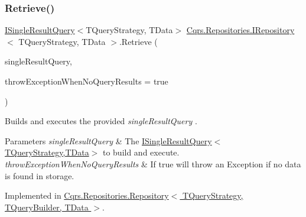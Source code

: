 \mbox{\label{interfaceCqrs_1_1Repositories_1_1IRepository_a65848508067b81e82da72af2063f2c07_a65848508067b81e82da72af2063f2c07}} 
\subsubsection{\texorpdfstring{Retrieve()}{Retrieve()}\hspace{0.1cm}{\footnotesize\ttfamily [1/2]}}
{\footnotesize\ttfamily \hyperlink{interfaceCqrs_1_1Repositories_1_1Queries_1_1ISingleResultQuery}{I\+Single\+Result\+Query}$<$T\+Query\+Strategy, T\+Data$>$ \hyperlink{interfaceCqrs_1_1Repositories_1_1IRepository}{Cqrs.\+Repositories.\+I\+Repository}$<$ T\+Query\+Strategy, T\+Data $>$.Retrieve (\begin{DoxyParamCaption}\item[{\hyperlink{interfaceCqrs_1_1Repositories_1_1Queries_1_1ISingleResultQuery}{I\+Single\+Result\+Query}$<$ T\+Query\+Strategy, T\+Data $>$}]{single\+Result\+Query,  }\item[{bool}]{throw\+Exception\+When\+No\+Query\+Results = {\ttfamily true} }\end{DoxyParamCaption})}



Builds and executes the provided {\itshape single\+Result\+Query} . 


\begin{DoxyParams}{Parameters}
{\em single\+Result\+Query} & The \hyperlink{interfaceCqrs_1_1Repositories_1_1Queries_1_1ISingleResultQuery}{I\+Single\+Result\+Query$<$\+T\+Query\+Strategy,\+T\+Data$>$} to build and execute.\\
\hline
{\em throw\+Exception\+When\+No\+Query\+Results} & If true will throw an Exception if no data is found in storage.\\
\hline
\end{DoxyParams}


Implemented in \hyperlink{classCqrs_1_1Repositories_1_1Repository_a4f83093a92d8141cdc2b908bbbd97f32_a4f83093a92d8141cdc2b908bbbd97f32}{Cqrs.\+Repositories.\+Repository$<$ T\+Query\+Strategy, T\+Query\+Builder, T\+Data $>$}.

\mbox{\label{interfaceCqrs_1_1Repositories_1_1IRepository_a0faeb50aa395d63ccd81e66906360e81_a0faeb50aa395d63ccd81e66906360e81}} 
